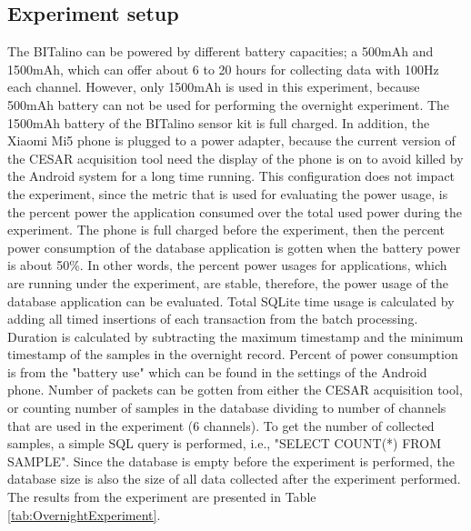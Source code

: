\subsection{Experiment setup}
The BITalino can be powered by different battery capacities; a 500mAh and 1500mAh, which can offer about 6 to 20 hours for collecting data with 100Hz each channel. However, only 1500mAh is used in this experiment, because 500mAh battery can not be used for performing the overnight experiment. The 1500mAh battery of the BITalino sensor kit is full charged. In addition, the Xiaomi Mi5 phone is plugged to a power adapter, because the current version of the CESAR acquisition tool need the display of the phone is on to avoid killed by the Android system for a long time running. This configuration does not impact the experiment, since the metric that is used for evaluating the power usage, is the percent power the application consumed over the total used power during the experiment. The phone is full charged before the experiment, then the percent power consumption of the database application is gotten when the battery power is about 50\%. In other words, the percent power usages for applications, which are running under the experiment, are stable, therefore, the power usage of the database application can be evaluated. Total SQLite time usage is calculated by adding all timed insertions of each transaction from the batch processing. Duration is calculated by subtracting the maximum timestamp and the minimum timestamp of the samples in the overnight record. Percent of power consumption is from the "battery use" which can be found in the settings of the Android phone. Number of packets can be gotten from either the CESAR acquisition tool, or counting number of samples in the database dividing to number of channels that are used in the experiment (6 channels). To get the number of collected samples, a simple SQL query is performed, i.e., "SELECT COUNT(*) FROM SAMPLE". Since the database is empty before the experiment is performed, the database size is also the size of all data collected after the experiment performed. The results from the experiment are presented in Table \ref{tab:OvernightExperiment}.
